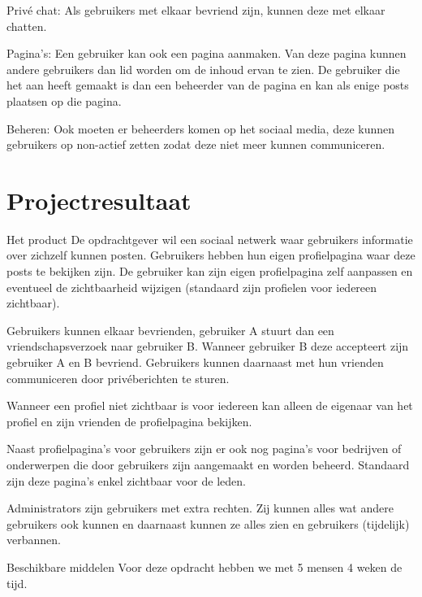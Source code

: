 \documentclass{uva-inf-article}
\begin{document}
Priv\'e chat: Als gebruikers met elkaar bevriend zijn, kunnen deze met elkaar chatten.

Pagina’s: Een gebruiker kan ook een pagina aanmaken. Van deze pagina kunnen andere gebruikers dan lid worden om de inhoud ervan te zien. De gebruiker die het aan heeft gemaakt is dan een beheerder van de pagina en kan als enige posts plaatsen op die pagina.

Beheren: Ook moeten er beheerders komen op het sociaal media, deze kunnen gebruikers op non-actief zetten zodat deze niet meer kunnen communiceren.


\section{Projectresultaat}
Het product
De opdrachtgever wil een sociaal netwerk waar gebruikers informatie over zichzelf kunnen posten. Gebruikers hebben hun eigen profielpagina waar deze posts te bekijken zijn. De gebruiker kan zijn eigen profielpagina zelf aanpassen en eventueel de zichtbaarheid wijzigen (standaard zijn profielen voor iedereen zichtbaar).

Gebruikers kunnen elkaar bevrienden, gebruiker A stuurt dan een vriendschapsverzoek naar gebruiker B. Wanneer gebruiker B deze accepteert zijn gebruiker A en B bevriend. Gebruikers kunnen daarnaast met hun vrienden communiceren door priv\'eberichten te sturen.

Wanneer een profiel niet zichtbaar is voor iedereen kan alleen de eigenaar van het profiel en zijn vrienden de profielpagina bekijken.

Naast profielpagina's voor gebruikers zijn er ook nog pagina's voor bedrijven of onderwerpen die door gebruikers zijn aangemaakt en worden beheerd. Standaard zijn deze pagina's enkel zichtbaar voor de leden.

Administrators zijn gebruikers met extra rechten. Zij kunnen alles wat andere gebruikers ook kunnen en daarnaast kunnen ze alles zien en gebruikers (tijdelijk) verbannen.

Beschikbare middelen
Voor deze opdracht hebben we met 5 mensen 4 weken de tijd.

\end{document}
